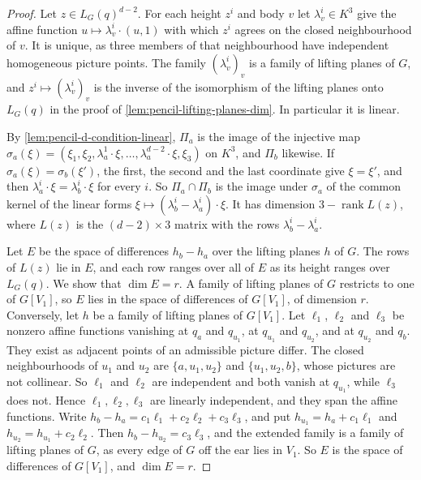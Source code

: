 \begin{proof}
  \leanok
  Let $z \in L_G(q)^{d-2}$. For each height $z^i$ and body $v$ let
  $\lambda^i_v \in K^3$ give the affine function
  $u \mapsto \lambda^i_v \cdot (u, 1)$ with which $z^i$ agrees on the
  closed neighbourhood of $v$. It is unique, as three members of that
  neighbourhood have independent homogeneous picture points. The family
  $(\lambda^i_v)_v$ is a family of lifting planes of $G$, and
  $z^i \mapsto (\lambda^i_v)_v$ is the inverse of the isomorphism of the
  lifting planes onto $L_G(q)$ in the proof of
  \cref{lem:pencil-lifting-planes-dim}. In particular it is linear.

  By \cref{lem:pencil-d-condition-linear}, $\Pi_a$ is the image of the
  injective map $\sigma_a(\xi) = (\xi_1, \xi_2, \lambda^1_a \cdot \xi,
  \dots, \lambda^{d-2}_a \cdot \xi, \xi_3)$ on $K^3$, and $\Pi_b$ likewise.
  If $\sigma_a(\xi) = \sigma_b(\xi')$, the first, the second and the last
  coordinate give $\xi = \xi'$, and then
  $\lambda^i_a \cdot \xi = \lambda^i_b \cdot \xi$ for every $i$. So
  $\Pi_a \cap \Pi_b$ is the image under $\sigma_a$ of the common kernel of
  the linear forms $\xi \mapsto (\lambda^i_b - \lambda^i_a) \cdot \xi$.
  It has dimension $3 - \operatorname{rank} L(z)$, where $L(z)$ is the
  $(d - 2) \times 3$ matrix with the rows $\lambda^i_b - \lambda^i_a$.

  Let $E$ be the space of differences $h_b - h_a$ over the lifting planes
  $h$ of $G$. The rows of $L(z)$ lie in $E$, and each row ranges over all
  of $E$ as its height ranges over $L_G(q)$. We show that $\dim E = r$. A
  family of lifting planes of $G$ restricts to one of $G[V_1]$, so $E$
  lies in the space of differences of $G[V_1]$, of dimension $r$.
  Conversely, let $h$ be a family of lifting planes of $G[V_1]$. Let
  $\ell_1$, $\ell_2$ and $\ell_3$ be nonzero affine functions vanishing
  at $q_a$ and $q_{u_1}$, at $q_{u_1}$ and $q_{u_2}$, and at $q_{u_2}$ and
  $q_b$. They exist as adjacent points of an admissible picture differ.
  The closed neighbourhoods of $u_1$ and $u_2$ are $\{a, u_1, u_2\}$ and
  $\{u_1, u_2, b\}$, whose pictures are not collinear. So $\ell_1$ and
  $\ell_2$ are independent and both vanish at $q_{u_1}$, while $\ell_3$
  does not. Hence $\ell_1, \ell_2, \ell_3$ are linearly independent, and
  they span the affine functions. Write
  $h_b - h_a = c_1 \ell_1 + c_2 \ell_2 + c_3 \ell_3$, and put
  $h_{u_1} = h_a + c_1 \ell_1$ and $h_{u_2} = h_{u_1} + c_2 \ell_2$. Then
  $h_b - h_{u_2} = c_3 \ell_3$, and the extended family is a family of
  lifting planes of $G$, as every edge of $G$ off the ear lies in $V_1$.
  So $E$ is the space of differences of $G[V_1]$, and $\dim E = r$.


\end{proof}
